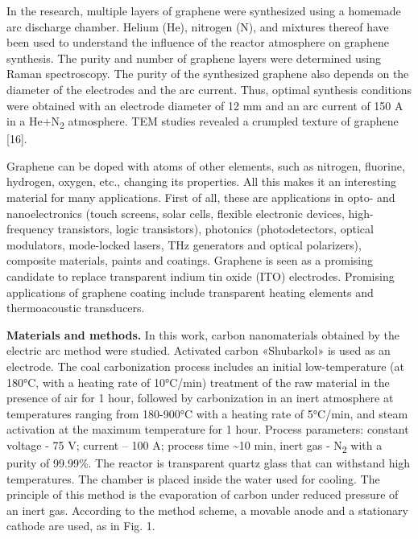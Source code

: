\begin{multicols}{2}
In the research, multiple layers of graphene were synthesized using a
homemade arc discharge chamber. Helium (He), nitrogen (N), and mixtures
thereof have been used to understand the influence of the reactor
atmosphere on graphene synthesis. The purity and number of graphene
layers were determined using Raman spectroscopy. The purity of the
synthesized graphene also depends on the diameter of the electrodes and
the arc current. Thus, optimal synthesis conditions were obtained with
an electrode diameter of 12 mm and an arc current of 150 A in a
He+N\textsubscript{2} atmosphere. TEM studies revealed a crumpled
texture of graphene {[}16{]}.

Graphene can be doped with atoms of other elements, such as nitrogen,
fluorine, hydrogen, oxygen, etc., changing its properties. All this
makes it an interesting material for many applications. First of all,
these are applications in opto- and nanoelectronics (touch screens,
solar cells, flexible electronic devices, high-frequency transistors,
logic transistors), photonics (photodetectors, optical modulators,
mode-locked lasers, THz generators and optical polarizers), composite
materials, paints and coatings. Graphene is seen as a promising
candidate to replace transparent indium tin oxide (ITO) electrodes.
Promising applications of graphene coating include transparent heating
elements and thermoacoustic transducers.

{\bfseries Materials and methods.} In this work, carbon nanomaterials
obtained by the electric arc method were studied. Activated carbon
«Shubarkol» is used as an electrode. The coal carbonization process
includes an initial low-temperature (at 180°C, with a heating rate of
10°C/min) treatment of the raw material in the presence of air for 1
hour, followed by carbonization in an inert atmosphere at temperatures
ranging from 180-900°C with a heating rate of 5°C/min, and steam
activation at the maximum temperature for 1 hour. Process parameters:
constant voltage - 75 V; current -- \hspace{0pt}\hspace{0pt}100 A;
process time \textasciitilde10 min, inert gas - N\textsubscript{2} with
a purity of 99.99\%. The reactor is transparent quartz glass that can
withstand high temperatures. The chamber is placed inside the water used
for cooling. The principle of this method is the evaporation of carbon
under reduced pressure of an inert gas. According to the method scheme,
a movable anode and a stationary cathode are used, as in Fig. 1.
\end{multicols}

